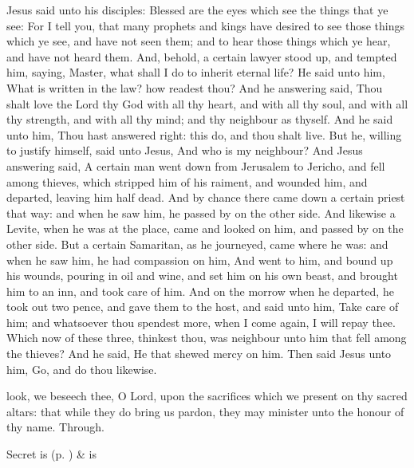 
 Jesus said unto his disciples: Blessed are the eyes which see the things that ye see: For I tell you, that many prophets and kings have desired to see those things which ye see, and have not seen them; and to hear those things which ye hear, and have not heard them. And, behold, a certain lawyer stood up, and tempted him, saying, Master, what shall I do to inherit eternal life? He said unto him, What is written in the law? how readest thou? And he answering said, Thou shalt love the Lord thy God with all thy heart, and with all thy soul, and with all thy strength, and with all thy mind; and thy neighbour as thyself. And he said unto him, Thou hast answered right: this do, and thou shalt live. But he, willing to justify himself, said unto Jesus, And who is my neighbour? And Jesus answering said, A certain man went down from Jerusalem to Jericho, and fell among thieves, which stripped him of his raiment, and wounded him, and departed, leaving him half dead. And by chance there came down a certain priest that way: and when he saw him, he passed by on the other side. And likewise a Levite, when he was at the place, came and looked on him, and passed by on the other side. But a certain Samaritan, as he journeyed, came where he was: and when he saw him, he had compassion on him, And went to him, and bound up his wounds, pouring in oil and wine, and set him on his own beast, and brought him to an inn, and took care of him. And on the morrow when he departed, he took out two pence, and gave them to the host, and said unto him, Take care of him; and whatsoever thou spendest more, when I come again, I will repay thee. Which now of these three, thinkest thou, was neighbour unto him that fell among the thieves? And he said, He that shewed mercy on him. Then said Jesus unto him, Go, and do thou likewise.


\secret
{} look, we beseech thee, O Lord, upon the sacrifices which we present on thy sacred altars: that while they do bring us pardon, they may minister unto the honour of thy name. Through.
\begin{rubric}
     Secret is  (p. \pageref{SPSaints}) \&  is 
\end{rubric}

